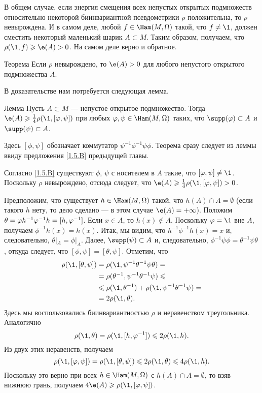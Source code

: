 В общем случае, если энергия смещения всех непустых открытых подмножеств относительно некоторой биинвариантной псевдометрики $\rho$ положительна, то $\rho$ невырождена.
И в самом деле, любой $f \in \Ham (M, \Omega)$ такой, что $f \ne \1$,
должен сместить некоторый маленький шарик $A \subset M$.
Таким образом, получаем, что $\rho (\1, f) \ge \e (A)> 0$.
На самом деле верно и обратное.

\begin{thm}[(\cite{EP})]{Теорема}\label{2.4.A}
Если $\rho$ невырождено, то $\e (A)> 0$ для любого непустого открытого подмножества $A$.
\end{thm}

В доказательстве нам потребуется следующая лемма.

\begin{thm}{Лемма}\label{2.4.B}
Пусть $A \subset M$ --- непустое открытое подмножество.
Тогда $\e (A) \ge \tfrac14 \rho (\1, [\phi, \psi])$ при любых $\phi, \psi \in \Ham (M, \Omega)$ таких, что $\supp (\phi) \subset A$ и $\supp (\psi) \subset A$.
\end{thm}

Здесь $[\phi, \psi]$ обозначает коммутатор $\psi^{-1} \phi^{-1} \psi\phi$.
Теорема сразу следует из леммы ввиду предложения \ref{1.5.B} предыдущей главы.

Согласно \ref{1.5.B} существуют $\phi$, $\psi$ с носителем в $A$ такие, что $[\phi, \psi] \ne \1$.
Поскольку $\rho$ невырождено, отсюда следует, что $\e (A) \ge \tfrac14 \rho (\1, [\phi, \psi])> 0$.
\qeds

Предположим, что существует $h \in \Ham (M, \Omega)$ такой, что $h (A) \cap A = \emptyset$ (если такого $h$ нету, то дело сделано --- в этом случае $\e (A) = + \infty$).
Положим $\theta = \phi h^{-1} \phi^{-1} h \z= [h, \phi^{-1}]$.
Если $x \in A$, то $h (x) \notin A$.
Поскольку $\phi = \1$ вне $A$, получаем $\phi^{-1} h (x) = h (x)$.
Итак, мы видим, что $h^{-1} \phi^{-1} h (x) = x$ и, следовательно, $\theta|_A = \phi|_A$.
Далее, $\supp (\psi) \subset A$ и, следовательно, $\phi^{-1} \psi\phi = \theta^{-1} \psi\theta$, откуда следует, что $[\phi, \psi] = [\theta, \psi]$.
Отметим, что 
\begin{align*}
\rho (\1, [\theta, \psi]) &= \rho (\1, \psi^{-1} \theta^{-1} \psi\theta) =
\\
&=\rho (\theta^{-1}, \psi^{-1} \theta^{-1} \psi) \le
\\
&\le \rho (\1, \theta^{-1}) + \rho (\1, \psi^{-1} \theta^{-1} \psi) =
\\
&= 2\rho (\1, \theta).
\end{align*}
Здесь мы воспользовались биинвариантностью $\rho$ и неравенством треугольника.
Аналогично 
\[\rho (\1, \theta) = \rho (\1, [h, \phi^{-1}]) \le 2\rho (\1, h).\]
Из двух этих неравенств, получаем 
\[\rho (\1, [\phi, \psi]) = \rho (\1, [\theta, \psi]) \le 2\rho (\1, \theta) \le 4\rho (\1, h).\]
Поскольку это верно при всех $h \in \Ham (M, \Omega)$ с $h (A) \cap A =\emptyset$, то взяв нижнюю грань, получаем $4\e (A) \ge \rho (\1, [\phi, \psi])$.
\qeds

